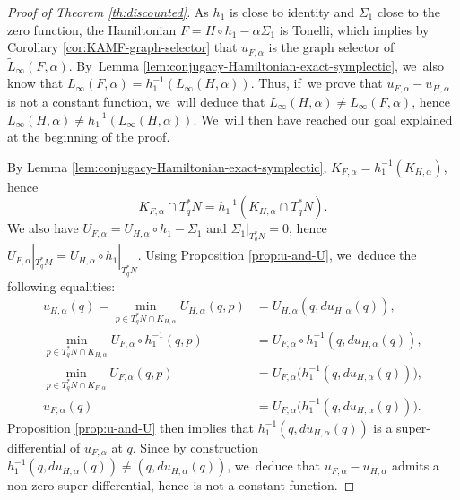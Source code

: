 \documentclass[10pt]{amsart}
\theoremstyle{definition}
\begin{document}
\begin{proof}[Proof of Theorem \ref{th:discounted}]
As $h_1$ is close to identity and $\Sigma_1$ close to the zero function, the Hamiltonian $F=H\circ h_1-\alpha \Sigma_1$ is Tonelli, which implies by Corollary \ref{cor:KAMF-graph-selector} that $u_{F,\alpha}$ is the graph selector of $\tilde L_\infty(F, \alpha)$. By~Lemma \ref{lem:conjugacy-Hamiltonian-exact-symplectic}, we~also know that $L_\infty(F, \alpha)=h_1^{-1}(L_\infty(H, \alpha))$. Thus, if~we prove that $u_{F, \alpha}-u_{H, \alpha}$ is not a constant function, we~will deduce that $L_\infty(H, \alpha)\neq L_\infty(F, \alpha)$, hence $L_\infty(H, \alpha)\neq h_1^{-1}(L_\infty(H, \alpha))$. We~will then have reached our goal explained at the beginning of the proof.

By Lemma \ref{lem:conjugacy-Hamiltonian-exact-symplectic}, $K_{F, \alpha}=h_1^{-1}(K_{H, \alpha})$, hence
\[
K_{F, \alpha}\cap T_q^*N=h_1^{-1}(K_{H, \alpha}\cap T^*_qN).
\]
We also have $U_{F, \alpha} = U_{H, \alpha}\circ h_1-\Sigma_1$ and $\Sigma_1|_{T^*_qN}=0$, hence $U_{F, \alpha}|_{T^*_qM}=U_{H, \alpha}\circ h_{1}|_{T_q^*N}$. Using Proposition \ref{prop:u-and-U}, we~deduce the following equalities:
\[
\begin{split}
u_{H, \alpha}(q)=\min_{p\in T^*_qN\cap K_{H, \alpha}}U_{H, \alpha}(q,p)&=U_{H, \alpha}(q, du_{H, \alpha}(q)),\\
\min_{p\in T^*_qN\cap K_{H, \alpha}}U_{F, \alpha}\circ h_1^{-1}(q,p)&=U_{F, \alpha}\circ h_1^{-1}(q, du_{H, \alpha}(q)),\\
\min_{p\in T^*_qN\cap K_{F, \alpha}}U_{F, \alpha}(q,p)&=U_{F, \alpha}\bigl(h_1^{-1}(q, du_{H, \alpha}(q))\bigr),\\
u_{F, \alpha}(q)&=U_{F, \alpha}\bigl(h_1^{-1}(q, du_{H, \alpha}(q))\bigr).
\end{split}
\]
Proposition \ref{prop:u-and-U} then implies that $h_1^{-1}(q, du_{H, \alpha}(q))$ is a super-differential of $u_{F, \alpha}$ at $q$. Since by construction $h_1^{-1}(q, du_{H, \alpha}(q))\neq (q, du_{H, \alpha}(q))$, we~deduce that $u_{F, \alpha}-u_{H, \alpha}$ admits a non-zero super-differential, hence is not a constant function.
\end{proof}
\end{document}
